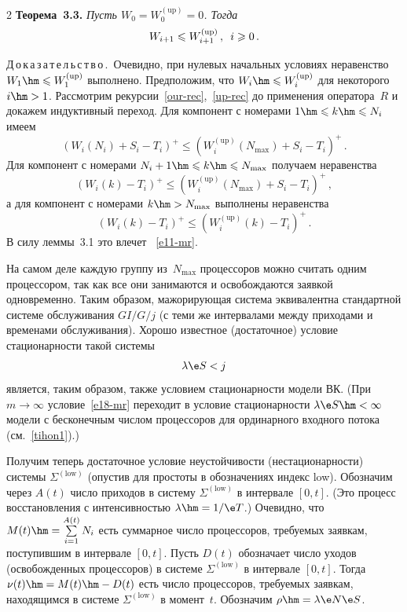 \begin{multicols}{2}
\textbf{Теорема~3.3.} 
\textit{Пусть $W_{0}=W^{(\mathrm{up})}_{0}=0$. Тогда}
\begin{equation}
W_{i+1}\leqslant W^{(\mathrm{up})}_{i+1}\,,\enskip i\geqslant 0\,.
\label{e11-mr}
\end{equation}


\noindent
Д\,о\,к\,а\,з\,а\,т\,е\,л\,ь\,с\,т\,в\,о\,.\
Очевидно, при нулевых начальных условиях неравенство $W_{1}\hm\leqslant
W^{(\mathrm{up})}_{1}$ выполнено. Предположим, что $W_{i}\hm\leqslant
W^{(\mathrm{up})}_{i}$ для некоторого $i\hm>1$.  Рассмотрим
рекурсии~\eqref{our-rec},~\eqref{up-rec} до применения оператора~$R$
и докажем индуктивный переход. Для компонент с номерами $1\hm\leqslant
k\hm\leqslant N_{i}$ имеем
\begin{equation*}
(W_{i}(N_{i})+S_{i}-T_{i})^{+}\leqslant (W^{(\mathrm{up})}_{i}(N_{\max})+S_{i}-T_{i})^{+}\,.
\end{equation*}
Для компонент с номерами $N_{i}+1\hm\leqslant k\hm\leqslant N_{\max}$
получаем неравенства
\begin{equation*}
(W_{i}(k)-T_{i})^{+}\leqslant
(W^{(\mathrm{up})}_{i}(N_{\max})+S_{i}-T_{i})^{+}\,,
\end{equation*}
а для компонент с номерами $k\hm> N_{\max}$ выполнены неравенства
\begin{equation*}
(W_{i}(k)-T_{i})^{+}\leqslant (W^{(\mathrm{up})}_{i}(k)-T_{i})^{+}\,.
\end{equation*}
В силу леммы~3.1 это влечет ~\eqref{e11-mr}.

\medskip

На самом деле каждую группу из~$N_{\max}$ процессоров можно считать
одним процессором, так как все они занимаются и освобождаются  заявкой
одновременно. Таким образом,  мажорирующая система эквивалентна
стандартной системе обслуживания $GI/G/j$ (с теми же интервалами
между приходами и  временами обслуживания). Хорошо известное
(достаточное) условие стационарности такой сис\-темы
\begin{equation}
\lambda \e S<j 
\label{e18-mr}
\end{equation}
является, таким образом, также  условием стационарности модели ВК.
(При $m\to\infty$ условие~\eqref{e18-mr} переходит в условие
стационарности $\lambda \e S\hm<\infty$ модели с бесконечным числом
процессоров для ординарного входного потока (см.\ \eqref{tihon1}).)

Получим теперь  достаточное условие неустойчивости (нестационарности)
 сис\-те\-мы $\Sigma^{(\mathrm{low})}$ (опус\-тив для простоты в обозначениях  индекс low).
 Обозначим через $A(t)$ число приходов в
систему $\Sigma^{(\mathrm{low})}$ в интервале $[0,t]$. (Это процесс
восстановления с интенсивностью $\lambda\hm=1/\e T$.) Очевидно, что
$M(t)\hm=\sum\limits_{i=1}^{A(t)}N_{i}$ есть суммарное число процессоров,
требуемых заявкам, поступившим  в интервале $[0,t]$. Пусть $D(t)$
обозначает число уходов (освобожденных процессоров) в сис\-те\-ме
$\Sigma^{(\mathrm{low})}$ в интервале $[0,t]$. Тогда $\nu(t)\hm=M(t)\hm-D(t)$  есть
чис\-ло процессоров, требуемых заявкам, находящимся в сис\-те\-ме
$\Sigma^{(\mathrm{low})}$ в момент~$t$. Обозначим $\rho\hm=\lambda \e N\e S$.


\end{multicols}

